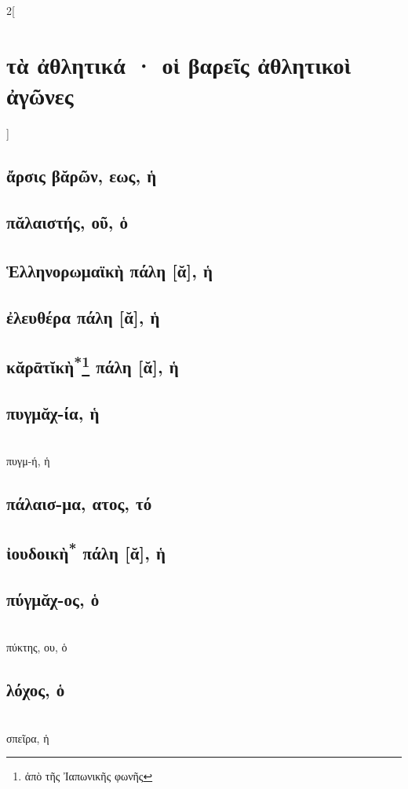 \documentclass{book}
\begin{document}
\begin{multicols}{2}[\section{τὰ ἀθλητικά · οἱ βαρεῖς ἀθλητικοὶ ἀγῶνες}] %
{\renewcommand \thesubsection {\thesection} }
\subsection{ἄρσις βᾰρῶν, εως, ἡ}
\subsection{πᾰλαιστής, οῦ, ὁ}
\subsection{Ἑλληνορωμαϊκὴ\textsuperscript{\textdagger} πάλη [ᾰ], ἡ}
\subsection{ἐλευθέρα πάλη [ᾰ], ἡ}
\subsection{κᾰρᾱτῐκὴ\textsuperscript{*}\protect\footnote{ἀπὸ τῆς Ἰαπωνικῆς φωνῆς} πάλη [ᾰ], ἡ}
\subsection{πυγμᾰχ-ία, ἡ}
 ~\\
πυγμ-ή, ἡ 
\subsection{πάλαισ-μα, ατος, τό}
\subsection{ἰουδοικὴ\textsuperscript{*\number\value{footnote}} πάλη [ᾰ], ἡ} 
\subsection{πύγμᾰχ-ος, ὁ}
 ~\\
πύκτης, ου, ὁ 
\subsection{λόχος, ὁ}
 ~\\
σπεῖρα, ἡ
~
\end{multicols}
\end{document}
